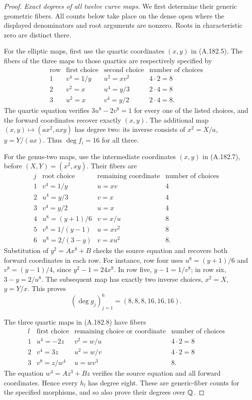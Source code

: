 \begin{proof}
\emph{Exact degrees of all twelve curve maps.}
We first determine their generic geometric fibers.  All counts
below take place on the dense open where the displayed
denominators and root arguments are nonzero.  Roots in
characteristic zero are distinct there.

For the elliptic maps, first use the quartic coordinates
\((x,y)\) in (A.182.5).  The fibers of the three maps
to those quartics are respectively specified by
\[
\begin{array}{c|c|c|c}
\text{row}&\text{first choice}&\text{second choice}
       &\text{number of choices}\\ \hline
1&v^4=1/y&u^2=xv^2&4\cdot2=8\\
2&v^2=x&u^4=y/3&2\cdot4=8\\
3&u^2=x&v^4=y/2&2\cdot4=8.
\end{array}
\tag{A.188.4}
\]
The quartic equation verifies \(3u^8-2v^8=1\)
for every one of the listed choices, and the forward
coordinates recover exactly \((x,y)\).  The additional
map \((x,y)\mapsto(ax^2,axy)\) has degree two:
its inverse consists of \(x^2=X/a\),
\(y=Y/(ax)\).  Thus \(\deg f_i=16\) for all three.

For the genus-two maps, use the intermediate coordinates
\((x,y)\) in (A.182.7), before
\((X,Y)=(x^2,xy)\).  Their fibers are
\[
\begin{array}{c|c|c|c}
j&\text{root choice}&\text{remaining coordinate}
    &\text{number of choices}\\ \hline
1&v^4=1/y&u=xv&4\\
2&u^4=y/3&v=x&4\\
3&v^4=y/2&u=x&4\\
4&u^8=(y+1)/6&v=x/u&8\\
5&v^8=1/(y-1)&u=xv^2&8\\
6&u^8=2/(3-y)&v=xu^2&8.
\end{array}
\tag{A.188.5}
\]
Substitution of \(y^2=Ax^8+B\) checks the source
equation and recovers both forward coordinates in each
row.  For instance, row four uses
\(u^8=(y+1)/6\) and \(v^8=(y-1)/4\), since
\(y^2-1=24x^8\).  In row five,
\(y-1=1/v^8\); in row six,
\(3-y=2/u^8\).  The subsequent map has exactly
two inverse choices, \(x^2=X\), \(y=Y/x\).
This proves
\[
                 (\deg g_j)_{j=1}^6=(8,8,8,16,16,16).
\tag{A.188.6}
\]

The three quartic maps in (A.182.8) have fibers
\[
\begin{array}{c|c|c|c}
l&\text{first choice}&\text{remaining choice or coordinate}
      &\text{number of choices}\\ \hline
1&u^4=-2z&v^2=w/u&4\cdot2=8\\
2&v^4=3z&u^2=w/v&4\cdot2=8\\
3&v^8=z/w^4&u=wv^3&8.
\end{array}
\tag{A.188.7}
\]
The equation \(w^4=Az^3+Bz\) verifies the source
equation and all forward coordinates.  Hence every
\(h_l\) has degree eight.  These are generic-fiber
counts for the specified morphisms, and so also prove
their degrees over \(\mathbb Q\).


\end{proof}
